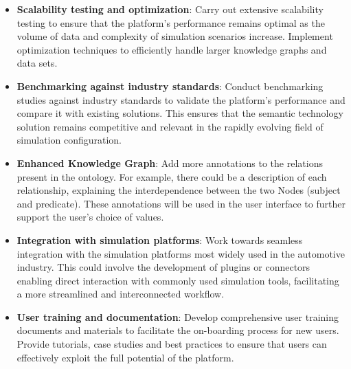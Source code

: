 \begin{itemize}
    \item \textbf{Scalability testing and optimization}: Carry out extensive scalability testing to ensure that the platform's performance remains optimal as the volume of data and complexity of simulation scenarios increase. Implement optimization techniques to efficiently handle larger knowledge graphs and data sets.
    
    \item \textbf{Benchmarking against industry standards}: Conduct benchmarking studies against industry standards to validate the platform's performance and compare it with existing solutions. This ensures that the semantic technology solution remains competitive and relevant in the rapidly evolving field of simulation configuration.
    
    \item \textbf{Enhanced Knowledge Graph}: Add more annotations to the relations present in the ontology. For example, there could be a description of each relationship, explaining the interdependence between the two Nodes (subject and predicate). These annotations will be used in the user interface to further support the user's choice of values.
    
    \item \textbf{Integration with simulation platforms}: Work towards seamless integration with the simulation platforms most widely used in the automotive industry. This could involve the development of plugins or connectors enabling direct interaction with commonly used simulation tools, facilitating a more streamlined and interconnected workflow.
    
    \item \textbf{User training and documentation}: Develop comprehensive user training documents and materials to facilitate the on-boarding process for new users. Provide tutorials, case studies and best practices to ensure that users can effectively exploit the full potential of the platform.
\end{itemize}

